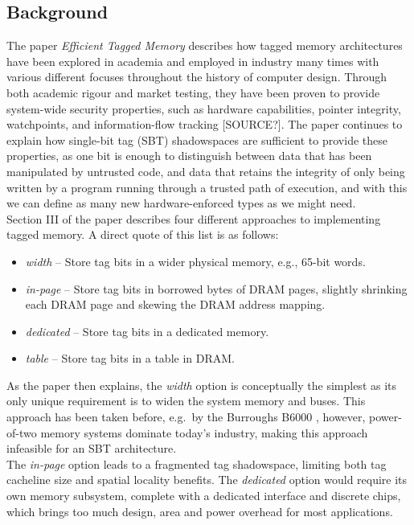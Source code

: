 \documentclass[10pt,a4paper]{article}
\begin{document}
\subsection*{Background}
The paper \textit{Efficient Tagged Memory} \cite{joannou2017efficient} describes how tagged memory architectures have been explored in academia and employed in industry many times with various different focuses throughout the history of computer design. Through both academic rigour and market testing, they have been proven to provide system-wide security properties, such as hardware capabilities, pointer integrity, watchpoints, and information-flow tracking [SOURCE?]. The paper continues to explain how single-bit tag (SBT) shadowspaces are sufficient to provide these properties, as one bit is enough to distinguish between data that has been manipulated by untrusted code, and data that retains the integrity of only being written by a program running through a trusted path of execution, and with this we can define as many new hardware-enforced types as we might need.\\
Section III of the paper describes four different approaches to implementing tagged memory. A direct quote of this list is as follows:
\begin{itemize}
\item \textit{width} -- Store tag bits in a wider physical memory, e.g., 65-bit words.
\item \textit{in-page} -- Store tag bits in borrowed bytes of DRAM pages, slightly shrinking each DRAM page and skewing the DRAM address mapping.
\item \textit{dedicated} -- Store tag bits in a dedicated memory.
\item \textit{table} -- Store tag bits in a table in DRAM.
\end{itemize}
As the paper then explains, the \textit{width} option is conceptually the simplest as its only unique requirement is to widen the system memory and buses. This approach has been taken before, e.g.\ by the Burroughs B6000 \cite{mayer1982architecture}, however, power-of-two memory systems dominate today's industry, making this approach infeasible for an SBT architecture.\\
The \textit{in-page} option leads to a fragmented tag shadowspace, limiting both tag cacheline size and spatial locality benefits. The \textit{dedicated} option would require its own memory subsystem, complete with a dedicated interface and discrete chips, which brings too much design, area and power overhead for most applications.\\
\end{document}
